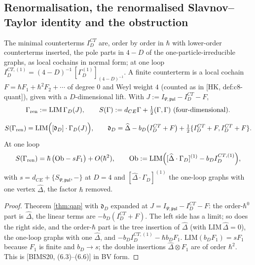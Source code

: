 \subsection{Renormalisation, the renormalised Slavnov--Taylor identity and the obstruction}

\begin{definition}
\label{def:ren}
The minimal counterterms $I^{CT}_D$ are, order by order in $\hbar$ with lower-order counterterms inserted, the pole parts in $4-D$ of the one-particle-irreducible graphs, as local cochains in normal form; at one loop $I^{CT,(1)}_D=(4-D)^{-1}\,[\Gamma^{(1)}_D]_{(4-D)^{-1}}$. A finite counterterm is a local cochain $F=\hbar F_1+\hbar^2F_2+\cdots$ of degree $0$ and Weyl weight $4$ (counted as in [HK, def:c8-quant]), given with a $D$-dimensional lift. With $J:=I_{\Psi,\mathfrak{psl}}-I^{CT}_D-F$,
\[
\Gamma_{\rm ren}:=\mathrm{LIM}\,\Gamma_D(J),\qquad S(\Gamma):=d_{CE}\Gamma+\tfrac12(\Gamma,\Gamma)\ \text{(four-dimensional)}.
\]
\end{definition}

\begin{theorem}
\label{thm:rst}
\[
S(\Gamma_{\rm ren})=\mathrm{LIM}\Big([\mathfrak d_D]\cdot\Gamma_D(J)\Big),\qquad \mathfrak d_D=\widehat\Delta-b_D\big(I^{CT}_D+F\big)+\tfrac12\{I^{CT}_D+F,I^{CT}_D+F\}.
\]
At one loop
\begin{equation}
S(\Gamma_{\rm ren})=\hbar\,\big(\mathrm{Ob}-sF_1\big)+O(\hbar^2),\qquad \mathrm{Ob}:=\mathrm{LIM}\Big([\widehat\Delta\cdot\Gamma_D]^{(1)}-b_DI^{CT,(1)}_D\Big),
\label{eq:Ob}
\end{equation}
with $s=d_{CE}+\{S_{\Psi,\mathfrak{psl}},-\}$ at $D=4$ and $[\widehat\Delta\cdot\Gamma_D]^{(1)}$ the one-loop graphs with one vertex $\widehat\Delta$, the factor $\hbar$ removed.
\end{theorem}

\begin{proof}
Theorem \ref{thm:qap} with $\mathfrak d_D$ expanded at $J=I_{\Psi,\mathfrak{psl}}-I^{CT}_D-F$: the order-$\hbar^0$ part is $\widehat\Delta$, the linear terms are $-b_D(I^{CT}_D+F)$. The left side has a limit; so does the right side, and the order-$\hbar$ part is the tree insertion of $\widehat\Delta$ (with $\mathrm{LIM}\,\widehat\Delta=0$), the one-loop graphs with one $\widehat\Delta$, and $-b_DI^{CT,(1)}_D-\hbar b_DF_1$. $\mathrm{LIM}(b_DF_1)=sF_1$ because $F_1$ is finite and $b_D\to s$; the double insertions $\widehat\Delta\otimes F_1$ are of order $\hbar^2$. This is [BIMS20, (6.3)--(6.6)] in BV form.
\end{proof}

